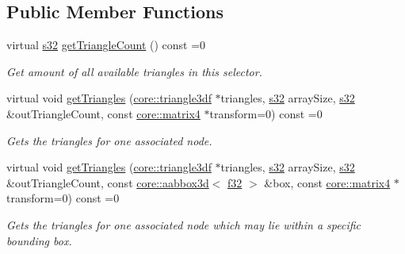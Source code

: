 \subsection*{Public Member Functions}
\begin{DoxyCompactItemize}
\item 
\mbox{\label{classirr_1_1scene_1_1ITriangleSelector_a0db5d5c5c9df15c41c00db40c692fcc6}} 
virtual \hyperlink{namespaceirr_ac66849b7a6ed16e30ebede579f9b47c6}{s32} \hyperlink{classirr_1_1scene_1_1ITriangleSelector_a0db5d5c5c9df15c41c00db40c692fcc6}{get\+Triangle\+Count} () const =0
\begin{DoxyCompactList}\small\item\em Get amount of all available triangles in this selector. \end{DoxyCompactList}\item 
virtual void \hyperlink{classirr_1_1scene_1_1ITriangleSelector_a63b547218902d57a44357d3a246e5070}{get\+Triangles} (\hyperlink{namespaceirr_1_1core_a8983bda2678a7a67d97bf3c7be6c31c7}{core\+::triangle3df} $\ast$triangles, \hyperlink{namespaceirr_ac66849b7a6ed16e30ebede579f9b47c6}{s32} array\+Size, \hyperlink{namespaceirr_ac66849b7a6ed16e30ebede579f9b47c6}{s32} \&out\+Triangle\+Count, const \hyperlink{namespaceirr_1_1core_a4c9d4e29899535971052810954a14431}{core\+::matrix4} $\ast$transform=0) const =0
\begin{DoxyCompactList}\small\item\em Gets the triangles for one associated node. \end{DoxyCompactList}\item 
virtual void \hyperlink{classirr_1_1scene_1_1ITriangleSelector_aa0bd1a2f9b429fcf7ff2ce4d6c7acd50}{get\+Triangles} (\hyperlink{namespaceirr_1_1core_a8983bda2678a7a67d97bf3c7be6c31c7}{core\+::triangle3df} $\ast$triangles, \hyperlink{namespaceirr_ac66849b7a6ed16e30ebede579f9b47c6}{s32} array\+Size, \hyperlink{namespaceirr_ac66849b7a6ed16e30ebede579f9b47c6}{s32} \&out\+Triangle\+Count, const \hyperlink{classirr_1_1core_1_1aabbox3d}{core\+::aabbox3d}$<$ \hyperlink{namespaceirr_a0277be98d67dc26ff93b1a6a1d086b07}{f32} $>$ \&box, const \hyperlink{namespaceirr_1_1core_a4c9d4e29899535971052810954a14431}{core\+::matrix4} $\ast$transform=0) const =0
\begin{DoxyCompactList}\small\item\em Gets the triangles for one associated node which may lie within a specific bounding box. \end{DoxyCompactList}\item 

\end{DoxyCompactItemize}
